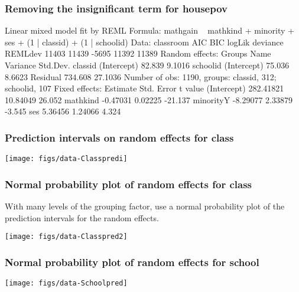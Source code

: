\begin{frame}[fragile]
  \frametitle{Removing the insignificant term for housepov}
\begin{Schunk}
\begin{Soutput}
Linear mixed model fit by REML 
Formula: mathgain ~ mathkind + minority + ses + (1 | classid) + (1 | schoolid) 
   Data: classroom 
   AIC   BIC logLik deviance REMLdev
 11403 11439  -5695    11392   11389
Random effects:
 Groups   Name        Variance Std.Dev.
 classid  (Intercept)  82.839   9.1016 
 schoolid (Intercept)  75.036   8.6623 
 Residual             734.608  27.1036 
Number of obs: 1190, groups: classid, 312; schoolid, 107
Fixed effects:
             Estimate Std. Error t value
(Intercept) 282.41821   10.84049  26.052
mathkind     -0.47031    0.02225 -21.137
minorityY    -8.29077    2.33879  -3.545
ses           5.36456    1.24066   4.324
\end{Soutput}
\end{Schunk}
\end{frame}

\begin{frame}
  \frametitle{Prediction intervals on random effects for class}
  \begin{center}
\texttt{[image: figs/data-Classpredi]}
  \end{center}
\end{frame}

\begin{frame}[fragile]
  \frametitle{Normal probability plot of random effects for class}
  With many levels of the grouping factor, use a normal probability
  plot of the prediction intervals for the random effects.
\begin{Schunk}
\end{Schunk}
  \begin{center}
\texttt{[image: figs/data-Classpred2]}
  \end{center}
\end{frame}

\begin{frame}[fragile]
  \frametitle{Normal probability plot of random effects for school}
  \begin{center}
\texttt{[image: figs/data-Schoolpred]}
  \end{center}
\end{frame}

